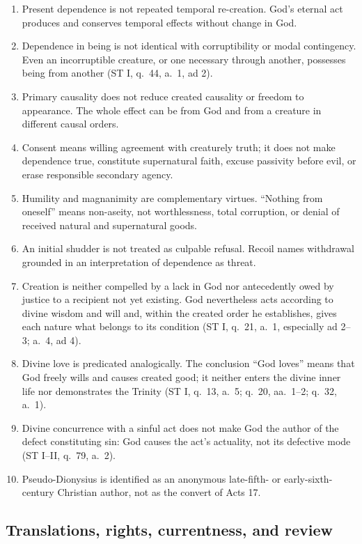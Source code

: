 \begin{enumerate}[leftmargin=1.45em,itemsep=0.25em]
\item Present dependence is not repeated temporal re-creation. God's eternal act produces and conserves temporal effects without change in God.
\item Dependence in being is not identical with corruptibility or modal contingency. Even an incorruptible creature, or one necessary through another, possesses being from another (ST I, q.~44, a.~1, ad 2).
\item Primary causality does not reduce created causality or freedom to appearance. The whole effect can be from God and from a creature in different causal orders.
\item Consent means willing agreement with creaturely truth; it does not make dependence true, constitute supernatural faith, excuse passivity before evil, or erase responsible secondary agency.
\item Humility and magnanimity are complementary virtues. ``Nothing from oneself'' means non-aseity, not worthlessness, total corruption, or denial of received natural and supernatural goods.
\item An initial shudder is not treated as culpable refusal. Recoil names withdrawal grounded in an interpretation of dependence as threat.
\item Creation is neither compelled by a lack in God nor antecedently owed by justice to a recipient not yet existing. God nevertheless acts according to divine wisdom and will and, within the created order he establishes, gives each nature what belongs to its condition (ST I, q.~21, a.~1, especially ad 2--3; a.~4, ad 4).
\item Divine love is predicated analogically. The conclusion ``God loves'' means that God freely wills and causes created good; it neither enters the divine inner life nor demonstrates the Trinity (ST I, q.~13, a.~5; q.~20, aa.~1--2; q.~32, a.~1).
\item Divine concurrence with a sinful act does not make God the author of the defect constituting sin: God causes the act's actuality, not its defective mode (ST I--II, q.~79, a.~2).
\item Pseudo-Dionysius is identified as an anonymous late-fifth- or early-sixth-century Christian author, not as the convert of Acts 17.
\end{enumerate}

\subsection{Translations, rights, currentness, and review}

